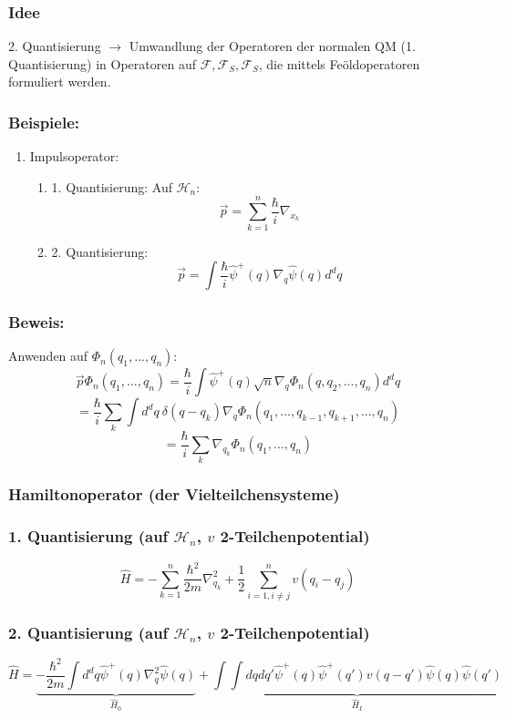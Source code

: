 \documentclass[twoside,a4paper]{scrartcl}
\renewcommand{\1}{\mathds{1}}
\newcommand{\ra}{\rightarrow}
\renewcommand{\H}{\mathcal{H}}
\newcommand{\F}{\mathcal{F}}
\begin{document}
\subsubsection*{Idee}
2. Quantisierung $\ra$ Umwandlung der Operatoren der normalen QM (1. Quantisierung) in Operatoren auf $\F,\F_S,\F_S$, die mittels Feöldoperatoren formuliert werden.
\subsubsection*{Beispiele:}
\begin{enumerate}
\item Impulsoperator:
\begin{enumerate}
\item 1. Quantisierung: Auf $\H_n$: $$\vec p=\sum_{k=1}^n \frac{\hbar}{i} \nabla_{x_k}$$
\item 2. Quantisierung: $$\vec p=\int \frac{\hbar}{i} \hat \psi^+(q) \nabla_q \hat \psi(q) d^dq$$
\end{enumerate}
\end{enumerate}
\subsubsection*{Beweis:}
Anwenden auf $\Phi_n(q_1,...,q_n)$:\\
$$\vec p \Phi_n(q_1,...,q_n)=\frac{\hbar}{i} \int \hat \psi^+(q) \sqrt{n} \nabla_q \Phi_n(q,q_2,...,q_n) d^dq$$
$$=\frac{\hbar}{i} \sum_k \int d^dq \ \delta(q-q_k) \nabla_q \Phi_n(q_1,...,q_{k-1},q_{k+1},...,q_n) $$
$$=\frac{\hbar}{i} \sum_k  \nabla_{q_k} \Phi_n(q_1,...,q_n) $$
\subsubsection*{Hamiltonoperator (der Vielteilchensysteme)}
\subsubsection*{1. Quantisierung (auf $\H_n$, $v$ 2-Teilchenpotential)}
$$\hat H=-\sum_{k=1}^n \frac{\hbar^2}{2m} \nabla^2_{q_k}+\frac{1}{2}\sum_{i=1,i\neq j}^n v(q_i-q_j)$$
\subsubsection*{2. Quantisierung (auf $\H_n$, $v$ 2-Teilchenpotential)}
$$\hat H=\underbrace{-\frac{\hbar^2}{2m}\int d^dq \hat \psi^+(q)  \nabla_{q}^2 \hat \psi(q)}_{\hat H_0}+\underbrace{\int \int dq dq' \hat \psi^+(q) \hat \psi^+(q') v(q-q')\hat \psi(q) \hat \psi(q') }_{\hat H_I}$$
\end{document}
